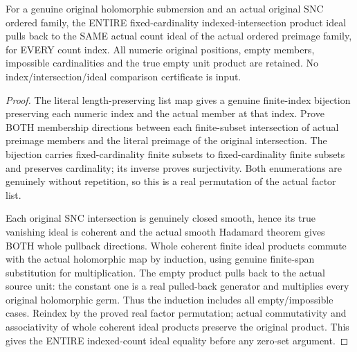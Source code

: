 \begin{theorem}
\label{hir:original-coherent-indexed-count-whole-smooth-pullback}
\leanok
For a genuine original holomorphic submersion and an actual original SNC
ordered family, the ENTIRE fixed-cardinality indexed-intersection product
ideal pulls back to the SAME actual count ideal of the actual ordered
preimage family, for EVERY count index. All numeric original positions,
empty members, impossible cardinalities and the true empty unit product
are retained. No index/intersection/ideal comparison certificate is input.
\end{theorem}
\begin{proof}
The literal length-preserving list map gives a genuine finite-index
bijection preserving each numeric index and the actual member at that
index. Prove BOTH membership directions between each finite-subset
intersection of actual preimage members and the literal preimage of the
original intersection. The bijection carries fixed-cardinality finite
subsets to fixed-cardinality finite subsets and preserves cardinality;
its inverse proves surjectivity. Both enumerations are genuinely without
repetition, so this is a real permutation of the actual factor list.

Each original SNC intersection is genuinely closed smooth, hence its
true vanishing ideal is coherent and the actual smooth Hadamard theorem
gives BOTH whole pullback directions. Whole coherent finite ideal products
commute with the actual holomorphic map by induction, using genuine
finite-span substitution for multiplication. The empty product pulls
back to the actual source unit: the constant one is a real pulled-back
generator and multiplies every original holomorphic germ. Thus the
induction includes all empty/impossible cases. Reindex by the proved
real factor permutation; actual commutativity and associativity of whole
coherent ideal products preserve the original product. This gives the
ENTIRE indexed-count ideal equality before any zero-set argument.
\end{proof}


